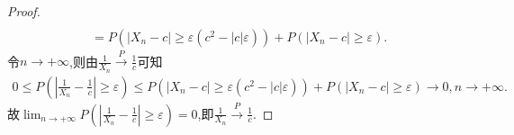 \documentclass[lang=cn,newtx,10pt,scheme=chinese]{../../Template/elegantbook}
\begin{document}
\begin{proof}
\begin{align*}
    \\
    &= P\left(\left|X_n - c\right| \geqslant \varepsilon(c^2 - |c|\varepsilon)\right) + P\left(\left|X_n - c\right| \geqslant \varepsilon\right).
\end{align*}
令\(n \to +\infty\),则由\(\frac{1}{X_n} \overset{P}{\rightarrow} \frac{1}{c}\)可知
\begin{align*}
   0 \leqslant P\left(\left|\frac{1}{X_n} - \frac{1}{c}\right| \geqslant \varepsilon\right) \leqslant P\left(\left|X_n - c\right| \geqslant \varepsilon(c^2 - |c|\varepsilon)\right) + P\left(\left|X_n - c\right| \geqslant \varepsilon\right) \to 0,n \to +\infty .
\end{align*}
故\(\lim_{n \to +\infty}P\left(\left|\frac{1}{X_n} - \frac{1}{c}\right| \geqslant \varepsilon\right) = 0\),即\(\frac{1}{X_n} \overset{P}{\rightarrow} \frac{1}{c}\).

\end{proof}
\end{document}
